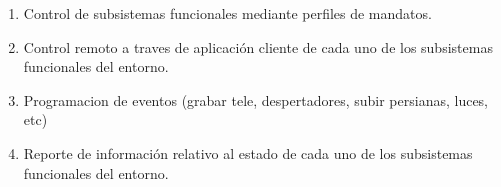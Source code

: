 \begin{enumerate}
    \item Control de subsistemas funcionales mediante perfiles de mandatos.

    \item Control remoto a traves de aplicación cliente de cada uno de los subsistemas funcionales del entorno.

    \item Programacion de eventos (grabar tele, despertadores, subir persianas, luces, etc)

    \item Reporte de información relativo al estado de cada uno de los subsistemas funcionales del entorno.

\end{enumerate}
